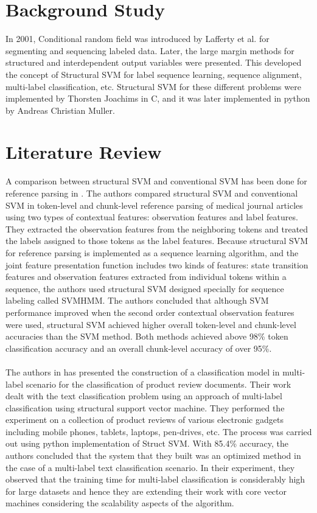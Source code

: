 \section{Background Study}
In 2001, Conditional random field was introduced by Lafferty et al. for segmenting and sequencing labeled data. Later, the large margin methods for structured and interdependent output variables \cite{Tsochantaridis2005} were presented. This developed the concept of Structural SVM for label sequence learning, sequence alignment, multi-label classification, etc. Structural SVM for these different problems were implemented by Thorsten Joachims in C, and it was later implemented in python by Andreas Christian Muller.

\section{Literature Review}
A comparison between structural SVM and conventional SVM has been done for reference parsing in \cite{Zhang2010}. The authors compared structural SVM and conventional SVM in token-level and chunk-level reference parsing of medical journal articles using two types of contextual features: observation features and label features. They extracted the observation features from the neighboring tokens and treated the labels assigned to those tokens as the label features. Because structural SVM for reference parsing is implemented as a sequence learning algorithm, and the joint feature presentation function includes two kinds of features: state transition features and observation features extracted from individual tokens within a sequence, the authors used structural SVM designed specially for sequence labeling called SVMHMM. The authors concluded that although SVM performance improved when the second order contextual observation features were used, structural SVM achieved higher overall token-level and chunk-level accuracies than the SVM method. Both methods achieved above 98\% token classification accuracy and an overall chunk-level accuracy of over 95\%.
\\\\
The authors in \cite{B.Chrystal2015} has presented the construction of a classification model in multi-label scenario for the classification of product review documents. Their work dealt with the text classification problem using an approach of multi-label classification using structural support vector machine. They performed the experiment on a collection of product reviews of various electronic gadgets including mobile phones, tablets, laptops, pen-drives, etc. The process was carried out using python implementation of Struct SVM. With 85.4\% accuracy, the authors concluded that the system that they built was an optimized method in the case of a multi-label text classification scenario. In their experiment, they observed that the training time for multi-label classification is considerably high for large datasets and hence they are extending their work with core vector machines considering the scalability aspects of the algorithm.
